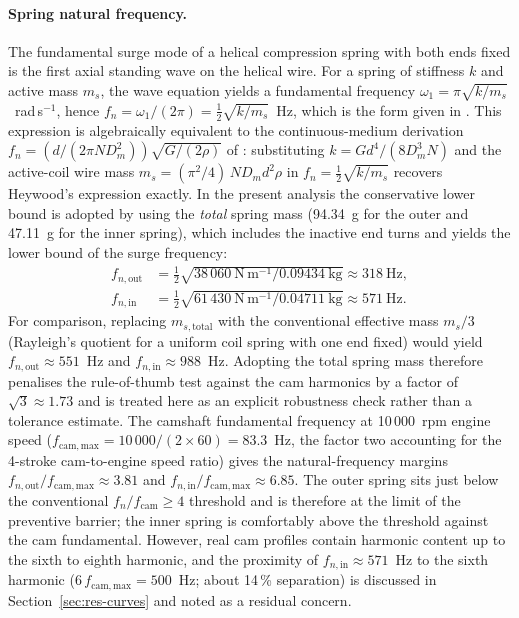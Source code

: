 \paragraph{Spring natural frequency.}
The fundamental surge mode of a helical compression spring with both
ends fixed is the first axial standing wave on the helical wire. For
a spring of stiffness $k$ and active mass $m_{s}$, the wave equation
yields a fundamental frequency
$\omega_{1}=\pi\sqrt{k/m_{s}}$~rad\,s$^{-1}$, hence
$f_{n}=\omega_{1}/(2\pi)=\tfrac{1}{2}\sqrt{k/m_{s}}$~Hz, which is the
form given in \citet[Eq.~10-26]{shigley2020}. This expression is
algebraically equivalent to the continuous-medium derivation
$f_{n}=(d/(2\pi N D_{m}^{2}))\sqrt{G/(2\rho)}$ of
\citet[\S~6.6]{heywood1988}: substituting
$k=Gd^{4}/(8 D_{m}^{3} N)$ and the active-coil wire mass
$m_{s}=(\pi^{2}/4)\,N D_{m} d^{2} \rho$ in
$f_{n}=\tfrac{1}{2}\sqrt{k/m_{s}}$ recovers Heywood's expression
exactly. In the present analysis the conservative lower bound is
adopted by using the \emph{total} spring mass (94.34~g for the outer
and 47.11~g for the inner spring), which includes the inactive end
turns and yields the lower bound of the surge frequency:
\begin{align}
f_{n,\mathrm{out}}&=\tfrac{1}{2}\sqrt{38\,060~\mathrm{N\,m^{-1}}/0.09434~\mathrm{kg}}\approx 318~\mathrm{Hz},\label{eq:fn-out}\\
f_{n,\mathrm{in}} &=\tfrac{1}{2}\sqrt{61\,430~\mathrm{N\,m^{-1}}/0.04711~\mathrm{kg}}\approx 571~\mathrm{Hz}.\label{eq:fn-in}
\end{align}
For comparison, replacing $m_{s,\mathrm{total}}$ with the conventional
effective mass $m_{s}/3$ (Rayleigh's quotient for a uniform coil
spring with one end fixed) would yield $f_{n,\mathrm{out}}\approx
551$~Hz and $f_{n,\mathrm{in}}\approx 988$~Hz. Adopting the total
spring mass therefore penalises the rule-of-thumb test against the
cam harmonics by a factor of $\sqrt{3}\approx 1.73$ and is treated
here as an explicit robustness check rather than a tolerance estimate.
The camshaft fundamental frequency at 10\,000~rpm engine speed
($f_{\mathrm{cam,max}}=10\,000/(2\times 60)=83.3$~Hz, the factor
two accounting for the 4-stroke cam-to-engine speed ratio) gives
the natural-frequency margins
$f_{n,\mathrm{out}}/f_{\mathrm{cam,max}}\approx 3.81$ and
$f_{n,\mathrm{in}}/f_{\mathrm{cam,max}}\approx 6.85$. The outer
spring sits just below the conventional
$f_{n}/f_{\mathrm{cam}}\geq 4$ threshold \citep{heywood1988} and is
therefore at the limit of the preventive barrier; the inner spring
is comfortably above the threshold against the cam fundamental.
However, real cam profiles contain harmonic content up to the sixth
to eighth harmonic, and the proximity of $f_{n,\mathrm{in}}\approx
571$~Hz to the sixth harmonic
($6\,f_{\mathrm{cam,max}}=500$~Hz; about 14\,\% separation) is
discussed in Section~\ref{sec:res-curves} and noted as a residual
concern.

